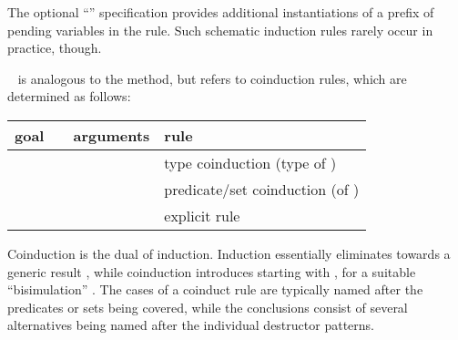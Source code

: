 \begin{isabellebody}
\begin{isamarkuptext}
\begin{description}
  The optional ``''
  specification provides additional instantiations of a prefix of
  pending variables in the rule.  Such schematic induction rules
  rarely occur in practice, though.

  \item \hyperlink{method.coinduct}{\mbox{}}~ is analogous to the
  \hyperlink{method.induct}{\mbox{}} method, but refers to coinduction rules, which are
  determined as follows:

  \medskip
  \begin{tabular}{llll}
    goal          &                    & arguments & rule \\\hline
                  & \hyperlink{method.coinduct}{\mbox{\isa{coinduct}}} & \isa{x} & type coinduction (type of \isa{x}) \\
    \isa{{\isaliteral{22}{\isachardoublequote}}A\ x{\isaliteral{22}{\isachardoublequote}}} & \hyperlink{method.coinduct}{\mbox{\isa{coinduct}}} & \isa{{\isaliteral{22}{\isachardoublequote}}{\isaliteral{5C3C646F74733E}{\isasymdots}}{\isaliteral{22}{\isachardoublequote}}} & predicate/set coinduction (of \isa{A}) \\
    \isa{{\isaliteral{22}{\isachardoublequote}}{\isaliteral{5C3C646F74733E}{\isasymdots}}{\isaliteral{22}{\isachardoublequote}}}   & \hyperlink{method.coinduct}{\mbox{\isa{coinduct}}} & \isa{{\isaliteral{22}{\isachardoublequote}}{\isaliteral{5C3C646F74733E}{\isasymdots}}\ rule{\isaliteral{3A}{\isacharcolon}}\ R{\isaliteral{22}{\isachardoublequote}}} & explicit rule \isa{R} \\
  \end{tabular}
  
  Coinduction is the dual of induction.  Induction essentially
  eliminates  towards a generic result ,
  while coinduction introduces  starting with , for a suitable ``bisimulation'' .  The cases of a
  coinduct rule are typically named after the predicates or sets being
  covered, while the conclusions consist of several alternatives being
  named after the individual destructor patterns.
  

\end{description}
\end{isamarkuptext}
\end{isabellebody}
